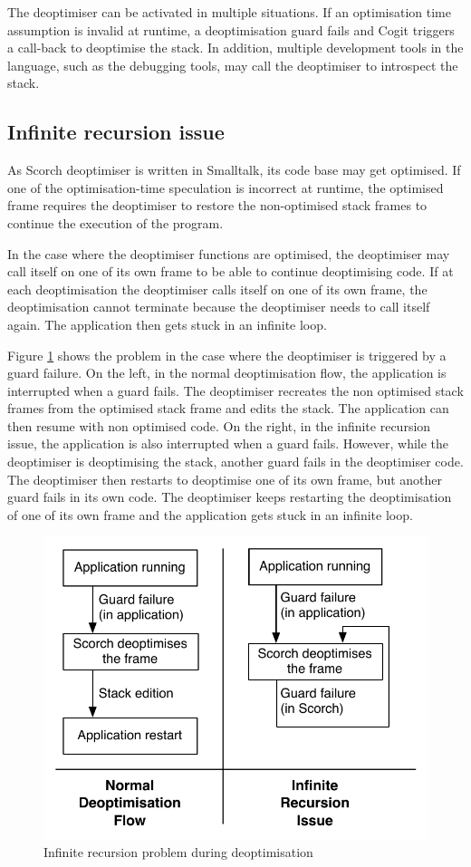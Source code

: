 \documentclass[a4paper,12pt,twoside]{../includes/ThesisStyle}
\begin{document}
The deoptimiser can be activated in multiple situations. If an optimisation time assumption is invalid at runtime, a deoptimisation guard fails and Cogit triggers a call-back to deoptimise the stack. In addition, multiple development tools in the language, such as the debugging tools, may call the deoptimiser to introspect the stack.

\subsection{Infinite recursion issue}

As Scorch deoptimiser is written in Smalltalk, its code base may get optimised. If one of the optimisation-time speculation is incorrect at runtime, the optimised frame requires the deoptimiser to restore the non-optimised stack frames to continue the execution of the program. 

In the case where the deoptimiser functions are optimised, the deoptimiser may call itself on one of its own frame to be able to continue deoptimising code. If at each deoptimisation the deoptimiser calls itself on one of its own frame, the deoptimisation cannot terminate because the deoptimiser needs to call itself again. The application then gets stuck in an infinite loop.

Figure \ref{fig:InfiniteRecursionDeoptPb} shows the problem in the case where the deoptimiser is triggered by a guard failure. On the left, in the normal deoptimisation flow, the application is interrupted when a guard fails. The deoptimiser recreates the non optimised stack frames from the optimised stack frame and edits the stack. The application can then resume with non optimised code. On the right, in the infinite recursion issue, the application is also interrupted when a guard fails. However, while the deoptimiser is deoptimising the stack, another guard fails in the deoptimiser code. The deoptimiser then restarts to deoptimise one of its own frame, but another guard fails in its own code. The deoptimiser keeps restarting the deoptimisation of one of its own frame and the application gets stuck in an infinite loop.

\begin{figure}[h!]
    \begin{center}
        \includegraphics[width=0.65\linewidth]{InfiniteRecursionDeoptPb}
        \caption{Infinite recursion problem during deoptimisation}
        \label{fig:InfiniteRecursionDeoptPb}
    \end{center}
\end{figure}
\end{document}

